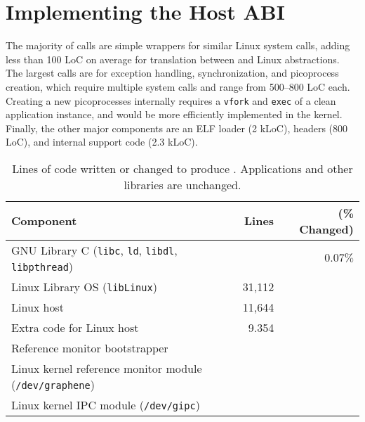 \section{Implementing the Host ABI}
\label{sec:linux:impl}


The majority of \pal{} calls are simple wrappers for similar Linux system calls, 
adding less than 100 LoC on average for translation between \pal{} and Linux abstractions.
The largest \pal{} calls are for exception handling, synchronization, and picoprocess
creation, which require multiple system calls and range from 500--800 LoC each.
Creating a new picoprocesses internally requires a {\tt vfork} and {\tt exec} of a clean 
application instance, and would be more efficiently implemented in the kernel.
Finally, the other major \pal{} components are an ELF loader (2 kLoC), headers (800 LoC),
and internal support code (2.3 kLoC).



\begin{table}[t!b!]
\footnotesize
\centering
\begin{tabular}{|l|rr|}
\hline
{\bf Component} & {\bf Lines} & ({\bf \% Changed})\\
\hline
GNU Library C ({\tt libc}, {\tt ld}, {\tt libdl}, {\tt libpthread}) & \libclines{} & $0.07\%$ \\
\hline
Linux Library OS ({\tt libLinux}) & 31,112 & \\
Linux host \pal{} & 11,644 & \\
Extra code for Linux \sgx{} host \pal{} & 9.354 & \\
\hline
Reference monitor bootstrapper & {} & \\
Linux kernel reference monitor module ({\tt /dev/graphene}) & \sandboxmodlines{} & \\
Linux kernel IPC module ({\tt /dev/gipc}) & \gipclines{} & \\
\hline
\end{tabular}
\caption[Lines of code written or changed in \graphene{}]
{Lines of code written or changed to produce \graphene{}.  Applications and other libraries are unchanged.}
\label{tab:graphene:loc}
\end{table}


